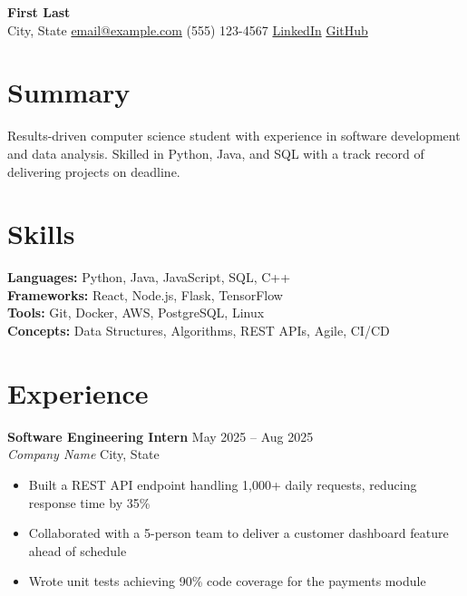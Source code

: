 \documentclass[11pt,letterpaper]{article}
\begin{document}
\begin{center}
    {\LARGE\bfseries %
    First Last} \\[4pt]
    City, State \quad
    \href{mailto:email@example.com}{email@example.com} \quad
    (555) 123-4567 \quad
    \href{https://linkedin.com/in/yourprofile}{LinkedIn} \quad
    \href{https://github.com/yourusername}{GitHub}
\end{center}

\section{Summary}
Results-driven computer science student with experience in software development and data analysis. Skilled in Python, Java, and SQL with a track record of delivering projects on deadline.

\section{Skills}
\textbf{Languages:} Python, Java, JavaScript, SQL, C++ \\
\textbf{Frameworks:} React, Node.js, Flask, TensorFlow \\
\textbf{Tools:} Git, Docker, AWS, PostgreSQL, Linux \\
\textbf{Concepts:} Data Structures, Algorithms, REST APIs, Agile, CI/CD

\section{Experience}

\textbf{Software Engineering Intern} \hfill May 2025 -- Aug 2025 \\
\textit{Company Name} \hfill City, State
\begin{itemize}
    \item Built a REST API endpoint handling 1,000+ daily requests, reducing response time by 35\%
    \item Collaborated with a 5-person team to deliver a customer dashboard feature ahead of schedule
    \item Wrote unit tests achieving 90\% code coverage for the payments module
\end{itemize}
\end{document}
